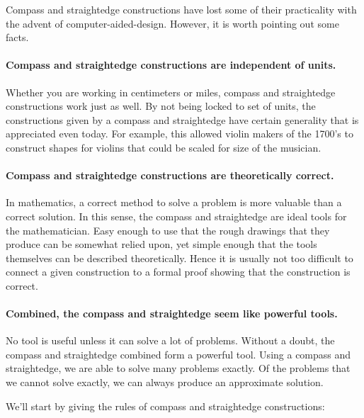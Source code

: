 \documentclass{ximera}
\begin{document}
Compass and straightedge constructions have lost some of their
practicality with the advent of computer-aided-design. However, it is
worth pointing out some facts.

\paragraph{Compass and straightedge constructions are \textbf{independent of units}.} 
Whether you are working in centimeters or miles, compass and
straightedge constructions work just as well. By not being locked to
set of units, the constructions given by a compass and straightedge
have certain generality that is appreciated even today. For example,
this allowed violin makers of the 1700's to construct shapes for
violins that could be scaled for size of the musician.


\paragraph{Compass and straightedge constructions are \textbf{theoretically correct}.} 
In mathematics, a correct method to solve a problem is more valuable
than a correct solution. In this sense, the compass and straightedge
are ideal tools for the mathematician. Easy enough to use that the
rough drawings that they produce can be somewhat relied upon, yet
simple enough that the tools themselves can be described
theoretically. Hence it is usually not too difficult to connect a
given construction to a formal proof showing that the construction is
correct.


\paragraph{Combined, the compass and straightedge seem like \textbf{powerful tools}.} 
No tool is useful unless it can solve a lot of problems. Without a
doubt, the compass and straightedge combined form a powerful
tool. Using a compass and straightedge, we are able to solve many
problems exactly. Of the problems that we cannot solve exactly, we can
always produce an approximate solution.


We'll start by giving the rules of compass and straightedge
constructions:
\end{document}
